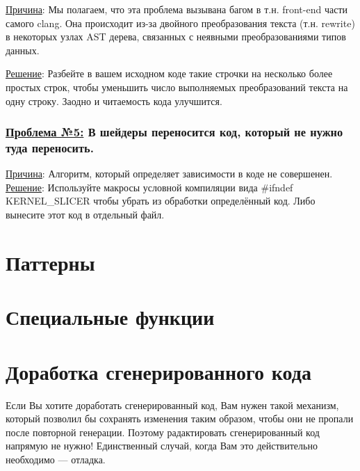 \documentclass[11pt,fleqn,english,russian]{report} %
\begin{document}
\noindent\underline{Причина}: Мы полагаем, что эта проблема вызывана багом в т.н. front-end части самого clang. Она происходит из-за двойного преобразования текста (т.н. rewrite) в некоторых узлах AST дерева, связанных с неявными преобразованиями типов данных. 

\underline{Решение}: Разбейте в вашем исходном коде такие строчки на несколько более простых строк, чтобы уменьшить число выполняемых преобразований текста на одну строку. Заодно и читаемость кода улучшится.

\subsection{\underline{Проблема №5:} В шейдеры переносится код, который не нужно туда переносить.}

\noindent\underline{Причина}: Алгоритм, который определяет зависимости в коде не совершенен. \underline{Решение}: Используйте макросы условной компиляции вида \#ifndef KERNEL\_SLICER чтобы убрать из обработки определённый код. Либо вынесите этот код в отдельный файл.  


\chapter{Паттерны}\label{patterns}

\chapter{Специальные функции}\label{spec_functions}

\chapter{Доработка сгенерированного кода}\label{work_with_generated_code}

Если Вы хотите доработать сгенерированный код, Вам нужен такой механизм, который позволил бы сохранять изменения таким образом, чтобы они не пропали после повторной генерации. Поэтому радактировать сгенерированный код напрямую не нужно! Единственный случай, когда Вам это действительно необходимо --- отладка.
\end{document}
